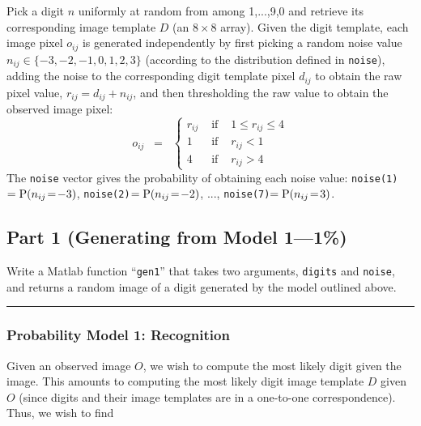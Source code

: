 \documentclass[12pt]{article}
\begin{document}
\noindent
Pick a digit $n$ uniformly at random from among 1,...,9,0
and retrieve its corresponding image template $D$ (an $8\times8$ array).
Given the digit template, each image pixel $o_{ij}$ is generated independently 
by first picking a random noise value $n_{ij}\in\{-3,-2,-1,0,1,2,3\}$
(according to the distribution defined in {\tt noise}),
adding the noise to the corresponding digit template pixel $d_{ij}$
to obtain the raw pixel value, $r_{ij}=d_{ij}+n_{ij}$,
and then thresholding the raw value to obtain the observed image pixel:
\[
o_{ij} \;\;=\;\;\left\{\begin{array}{cll}
r_{ij} & \mbox{ if } & 1\leq r_{ij}\leq4\\
1 & \mbox{ if } & r_{ij} < 1\\
4 & \mbox{ if } & r_{ij} > 4
\end{array}\right.
\]
The {\tt noise} vector gives the probability of obtaining each noise value:
{\tt noise(1)}$={\rm P}(n_{ij}\!=\!-3)$,
{\tt noise(2)}$={\rm P}(n_{ij}\!=\!-2)$,
...,
{\tt noise(7)}$={\rm P}(n_{ij}\!=\!3)$.




\subsection*{Part 1 \rm(Generating from Model 1---1\%)}

Write a Matlab function ``{\tt gen1}'' that takes two arguments,
{\tt digits} and {\tt noise}, and returns a random image of a 
digit generated by the model outlined above.


\vspace*{1\baselineskip}

\hrule

\subsubsection*{Probability Model 1: Recognition}

Given an observed image $O$, we wish to compute the most likely
digit given the image.  This amounts to computing the most likely
digit image template $D$ given $O$
(since digits and their image templates are in a one-to-one correspondence).
Thus, we wish to find
\end{document}
